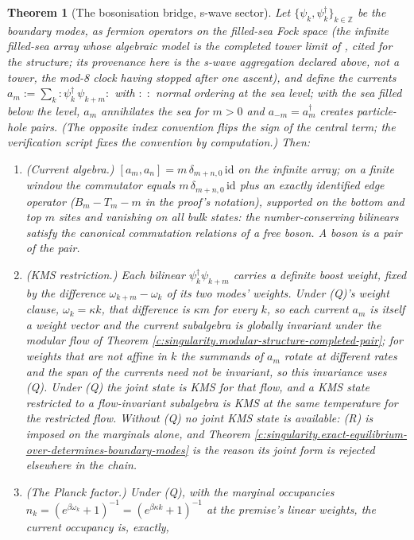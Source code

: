 \documentclass[11pt]{article}
\newtheorem{theorem}{Theorem}[section]
\theoremstyle{definition}
\theoremstyle{plain}
\newcommand{\changedmark}[2]{\marginpar{\raggedright\scriptsize\color{#1}#2}}
\providecommand{\id}{}\renewcommand{\id}{\mathrm{id}}
\begin{document}
\begin{theorem}[The bosonisation bridge, s-wave sector]\label{c:singularity.bosonisation-bridge-s-wave-sector}
\changedmark{BrickRed}{corrected since the deposit}
Let $\{\psi_k, \psi^\dagger_k\}_{k \in \mathbb{Z}}$ be the boundary modes, as fermion operators on the filled-sea Fock space (the infinite filled-sea array whose algebraic model is the completed tower limit of \cite[Thm.~5.6]{ButlerT3}, cited for the structure; its provenance here is the s-wave aggregation declared above, not a tower, the mod-8 clock having stopped after one ascent), and define the currents $a_m := \sum_k :\psi^\dagger_k\,\psi_{k+m}:$ with $:\;:$ normal ordering at the sea level; with the sea filled below the level, $a_m$ annihilates the sea for $m > 0$ and $a_{-m} = a_m^{\dagger}$ creates particle-hole pairs. (The opposite index convention flips the sign of the central term; the verification script fixes the convention by computation.) Then:
\begin{enumerate}
\item (Current algebra.) $[a_m, a_n] = m\,\delta_{m+n,0}\,\id$ on the infinite array; on a finite window the commutator equals $m\,\delta_{m+n,0}\,\id$ plus an \emph{exactly identified} edge operator ($B_m - T_m - m$ in the proof's notation), supported on the bottom and top $m$ sites and vanishing on all bulk states: the number-conserving bilinears satisfy the canonical commutation relations of a free boson. A boson is a pair of the pair.
\item (KMS restriction.) Each bilinear $\psi^\dagger_k\psi_{k+m}$ carries a definite boost weight, fixed by the difference $\omega_{k+m} - \omega_k$ of its two modes' weights. Under (Q)'s weight clause, $\omega_k = \kappa k$, that difference is $\kappa m$ for every $k$, so each current $a_m$ is itself a weight vector and the current subalgebra is globally invariant under the modular flow of Theorem \ref{c:singularity.modular-structure-completed-pair}; for weights that are not affine in $k$ the summands of $a_m$ rotate at different rates and the span of the currents need not be invariant, so this invariance uses (Q). Under (Q) the joint state is KMS for that flow, and a KMS state restricted to a flow-invariant subalgebra is KMS at the same temperature for the restricted flow. Without (Q) no joint KMS state is available: (R) is imposed on the marginals alone, and Theorem \ref{c:singularity.exact-equilibrium-over-determines-boundary-modes} is the reason its joint form is rejected elsewhere in the chain.
\item (The Planck factor.) Under (Q), with the marginal occupancies $n_k = (e^{\beta\omega_k} + 1)^{-1} = (e^{\beta\kappa k} + 1)^{-1}$ at the premise's linear weights, the current occupancy is, exactly,

\end{enumerate}
\end{theorem}
\end{document}
